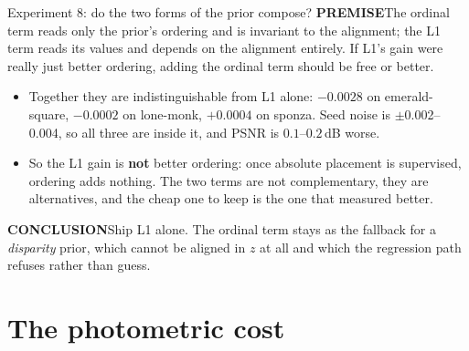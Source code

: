 \documentclass[aspectratio=169,9pt]{beamer}
\makeatletter
\newcommand{\code}[1]{{\ttfamily\fontsize{0.92\f@size}{\f@baselineskip}\selectfont #1}}
\newcommand{\lbl}[1]{\textcolor{lblcol}{\scriptsize\bfseries #1}\hspace{0.5em}}
\newcommand{\pre}{\lbl{PREMISE}}
\newcommand{\conc}{\lbl{CONCLUSION}}
\makeatother
\begin{document}
\begin{frame}{Experiment 8: do the two forms of the prior compose?}
  \pre The ordinal term reads only the prior's ordering and is invariant to the alignment; the L1
  term reads its values and depends on the alignment entirely. If L1's gain were really just
  better ordering, adding the ordinal term should be free or better.
  \begin{center}\scriptsize
    
  \end{center}
  \vspace{0.3em}
  \begin{itemize}\small
    \item Together they are indistinguishable from L1 alone: $-0.0028$ on
          \code{emerald-square}, $-0.0002$ on \code{lone-monk}, $+0.0004$ on \code{sponza}. Seed
          noise is $\pm$0.002--0.004, so all three are inside it, and PSNR is $0.1$--$0.2$\,dB
          worse.
    \item So the L1 gain is \textbf{not} better ordering: once absolute placement is supervised,
          ordering adds nothing. The two terms are not complementary, they are alternatives, and
          the cheap one to keep is the one that measured better.
  \end{itemize}
  \conc Ship L1 alone. The ordinal term stays as the fallback for a \emph{disparity} prior, which
  cannot be aligned in $z$ at all and which the regression path refuses rather than guess.
\end{frame}

\section{The photometric cost}
\end{document}
